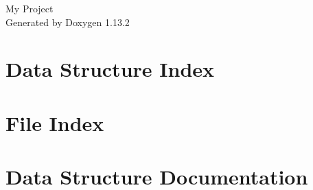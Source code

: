 \documentclass[twoside]{book}
\newcommand{\+}{\discretionary{\mbox{\scriptsize$\hookleftarrow$}}{}{}}
\newcommand{\clearemptydoublepage}{%
    \newpage{\pagestyle{empty}\cleardoublepage}%
  }
\begin{document}
  \raggedbottom
    \hypersetup{pageanchor=false,
                bookmarksnumbered=true,
                pdfencoding=unicode
               }
  \begin{titlepage}
  \vspace*{7cm}
  \begin{center}%
  {\Large My Project}\\
  \vspace*{1cm}
  {\large Generated by Doxygen 1.13.2}\\
  \end{center}
  \end{titlepage}
  \clearemptydoublepage
  \tableofcontents
  \clearemptydoublepage
  \hypersetup{pageanchor=true}
\chapter{Data Structure Index}

\chapter{File Index}

\chapter{Data Structure Documentation}




























\end{document}

